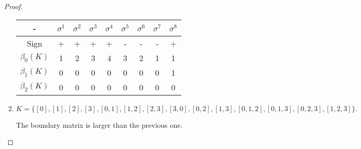 \begin{proof}
\begin{enumerate}
    \begin{center}
        \begin{tabular}{ c|c|c|c|c|c|c|c|c}
         - & $\sigma^1$ & $\sigma^2$ & $\sigma^3$ & $\sigma^4$ & $\sigma^5$ &
         $\sigma^6$ & $\sigma^7$ &$\sigma^8$ \\ 
         \hline
         Sign & + & + & + & + & - & - & - & + \\  
         $\beta_0(K)$ & 1 & 2 & 3 & 4 & 3 & 2 & 1 & 1 \\ 
         $\beta_1(K)$ & 0 & 0 & 0 & 0 & 0 & 0 & 0 & 1\\     
         $\beta_2(K)$ & 0 & 0 & 0 & 0 & 0 & 0 & 0 & 0\\     

        \end{tabular}
    \end{center}

    \item  $K = \{[0], [1], [2], [3], [0, 1], [1, 2], [2, 3], [3, 0], [0, 2], [1, 3], [0, 1, 2], [0, 1, 3], [0, 2, 3], [1, 2, 3]\}.
    $
    
    The boundary matrix is larger than the previous one. 


\end{enumerate}
\end{proof}
